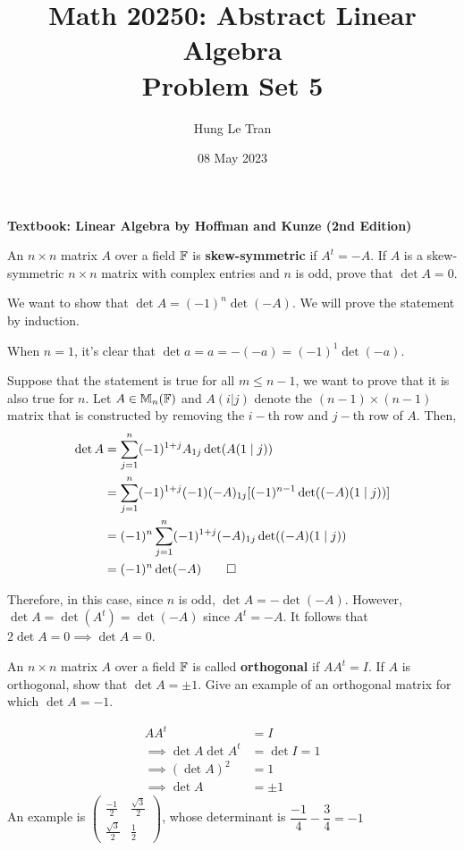 \documentclass[a4paper, 10pt]{article}
\title{Math 20250: Abstract Linear Algebra \\ \large Problem Set 5}
\date{08 May 2023}
\author{Hung Le Tran}
\begin{document}
\maketitle
\setcounter{section}{5}
\textbf{Textbook: Linear Algebra by Hoffman and Kunze (2nd Edition)}
\begin{problem} 
An \(n \times n\) matrix \(A\) over a field \(\mathbb{F}\) is \textbf{skew-symmetric} if \(A^t = -A\). If \(A\) is a skew-symmetric \(n \times n\) matrix with complex entries and \(n\) is odd, prove that \(\det A = 0\).
\end{problem}
\begin{solution}
    We want to show that \(\det A = (-1)^n \det (-A)\). We will prove the statement by induction.

    When \(n = 1\), it's clear that \(\det a = a = -(-a) = (-1)^1 \det (-a)\).

    Suppose that the statement is true for all \(m \leq n-1\), we want to prove that it is also true for \(n\). Let \(A \in \mathbb{M}_{n}(\mathbb{F})\) and \(A(i|j)\) denote the \((n-1) \times (n-1)\) matrix that is constructed by removing the \(i-\)th row and \(j-\)th row of \(A\). Then,
    \begin{align*}
        \det A & = \sum_{j=1}^{n} (-1)^{1+j}A_{1j}\det(A(1\mid j))                       \\
               & =\sum_{j=1}^{n} (-1)^{1+j} (-1)(-A)_{1j}[(-1)^{n-1}\det((-A)(1\mid j))] \\
               & = (-1)^n \sum_{j=1}^{n}(-1)^{1+j}(-A)_{1j}\det((-A)(1\mid j))           \\
               & = (-1)^n \det (-A) \qed
    \end{align*}

    Therefore, in this case, since \(n\) is odd, \(\det A = - \det(-A)\). However, \(\det A = \det (A^t) = \det (-A)\) since \(A^t = -A\). It follows that \(2\det A = 0 \implies \det A = 0\).
\end{solution}

\begin{problem} 
An \(n \times n\) matrix \(A\) over a field \(\mathbb{F}\) is called \textbf{orthogonal} if \(A A^t = I\). If \(A\) is orthogonal, show that \(\det A = \pm 1\). Give an example of an orthogonal matrix for which \(\det A = -1\).
\end{problem}
\begin{solution}
    \begin{align*}
        AA^t                     & = I          \\
        \implies \det A \det A^t & = \det I = 1 \\
        \implies (\det A) ^2     & = 1          \\
        \implies \det A          & = \pm 1
    \end{align*}
    An example is \(\begin{pmatrix}
        \frac{-1}{2}       & \frac{\sqrt{3}}{2} \\
        \frac{\sqrt{3}}{2} & \frac{1}{2}
    \end{pmatrix}\), whose determinant is \(\dfrac{-1}{4} - \dfrac{3}{4} = -1\)
\end{solution}
\end{document}

